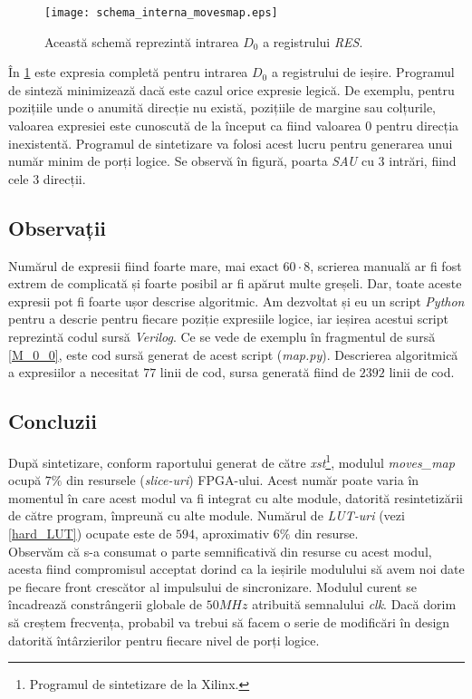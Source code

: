 \documentclass[12pt,twoside,a4paper,fleqn]{book}
\theoremstyle{definition}
\begin{document}
\begin{figure}[h]
\begin{center}
\texttt{[image: schema\_interna\_movesmap.eps]}
\caption{\small{Această schemă reprezintă intrarea $D_{0}$ a registrului \emph{RES}.}}
\label{fig:fig_moves_map_schema}
\end{center}
\end{figure}

În \ref{fig:fig_moves_map_schema} este expresia completă pentru intrarea $D_{0}$ a registrului de ieșire. Programul de sinteză minimizează dacă este cazul orice expresie legică. De exemplu, pentru pozițiile unde o anumită direcție nu există, pozițiile de margine sau colțurile, valoarea expresiei este cunoscută de la început ca fiind valoarea $0$ pentru direcția inexistentă. Programul de sintetizare va folosi acest lucru pentru generarea unui număr minim de porți logice. Se observă în figură, poarta \emph{SAU} cu $3$ intrări, fiind cele $3$ direcții.\\
\subsection{Observații}
Numărul de expresii fiind foarte mare, mai exact $60 \cdot 8$, scrierea manuală ar fi fost extrem de complicată și foarte posibil ar fi apărut multe greșeli. Dar, toate aceste expresii pot fi foarte ușor descrise algoritmic. Am dezvoltat și eu un script \emph{Python} pentru a descrie pentru fiecare poziție expresiile logice, iar ieșirea acestui script reprezintă codul sursă \emph{Verilog}. Ce se vede de exemplu în fragmentul de sursă \ref{M_0_0}, este cod sursă generat de acest script  (\emph{map.py}). Descrierea algoritmică a expresiilor a necesitat $77$ linii de cod, sursa generată fiind de $2392$ linii de cod.
\subsection{Concluzii}
După sintetizare, conform raportului generat de către \emph{xst}\footnote{Programul de sintetizare de la Xilinx.}, modulul \emph{moves\_map} ocupă $7\%$ din resursele (\emph{slice-uri}) FPGA-ului. Acest număr poate varia în momentul în care acest modul va fi integrat cu alte module, datorită resintetizării de către program, împreună cu alte module. Numărul de \emph{LUT-uri} (vezi \ref{hard_LUT}) ocupate este de $594$, aproximativ $6\%$ din resurse.\\
Observăm că s-a consumat o parte semnificativă din resurse cu acest modul, acesta fiind compromisul acceptat dorind ca la ieșirile modulului să avem noi date pe fiecare front crescător al impulsului de sincronizare. Modulul curent se încadrează constrângerii globale de $50MHz$ atribuită semnalului \emph{clk}. Dacă dorim să creștem frecvența, probabil va trebui să facem o serie de modificări în design datorită întârzierilor pentru fiecare nivel de porți logice.
\end{document}
